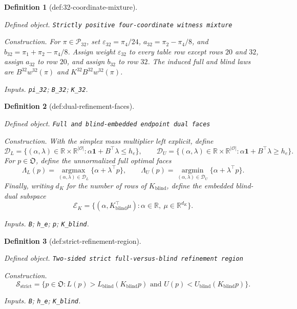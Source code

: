 \documentclass{article}
\newtheorem{definition}{Definition}
\begin{document}
\begin{definition}[def:32-coordinate-mixture]\label{def:32-coordinate-mixture}
\par\smallskip\noindent\emph{Defined object.} \texttt{Strictly positive four-\allowbreak{}coordinate witness mixture}
\par\smallskip\noindent\emph{Construction.} For \(\pi\in\mathcal P_{32}\), set \(\varepsilon_{32}=\pi_4/24\), \(a_{32}=\pi_2-\pi_4/8\), and \(b_{32}=\pi_1+\pi_2-\pi_4/8\). Assign weight \(\varepsilon_{32}\) to every table row except rows \(20\) and \(32\), assign \(a_{32}\) to row \(20\), and assign \(b_{32}\) to row \(32\). The induced full and blind laws are \(B^{32}w^{32}(\pi)\) and \(K^{32}B^{32}w^{32}(\pi)\).
\par\smallskip\noindent\emph{Inputs.} \texttt{pi\_\allowbreak{}32}; \texttt{B\_\allowbreak{}32}; \texttt{K\_\allowbreak{}32}.
\end{definition}

\begin{definition}[def:dual-refinement-faces]\label{def:dual-refinement-faces}
\par\smallskip\noindent\emph{Defined object.} \texttt{Full and blind-\allowbreak{}embedded endpoint dual faces}
\par\smallskip\noindent\emph{Construction.} With the simplex mass multiplier left explicit, define
\[
\mathcal D_L=\{(\alpha,\lambda)\in\mathbb R\times\mathbb R^{|\mathcal O|}:\alpha\mathbf 1+B^{\top}\lambda\leq h_e\},
\qquad
\mathcal D_U=\{(\alpha,\lambda)\in\mathbb R\times\mathbb R^{|\mathcal O|}:\alpha\mathbf 1+B^{\top}\lambda\geq h_e\}.
\]
For \(p\in\mathfrak O\), define the unnormalized full optimal faces
\[
\Lambda_L(p)=\operatorname*{argmax}_{(\alpha,\lambda)\in\mathcal D_L}
\{\alpha+\lambda^{\top}p\},
\qquad
\Lambda_U(p)=\operatorname*{argmin}_{(\alpha,\lambda)\in\mathcal D_U}
\{\alpha+\lambda^{\top}p\}.
\]
Finally, writing \(d_K\) for the number of rows of \(K_{\mathrm{blind}}\), define the embedded blind-dual subspace
\[
\mathcal E_K=\{(\alpha,K_{\mathrm{blind}}^{\top}\mu):
\alpha\in\mathbb R,\ \mu\in\mathbb R^{d_K}\}.
\]
\par\smallskip\noindent\emph{Inputs.} \texttt{B}; \texttt{h\_\allowbreak{}e}; \texttt{p}; \texttt{K\_\allowbreak{}blind}.
\end{definition}

\begin{definition}[def:strict-refinement-region]\label{def:strict-refinement-region}
\par\smallskip\noindent\emph{Defined object.} \texttt{Two-\allowbreak{}sided strict full-\allowbreak{}versus-\allowbreak{}blind refinement region}
\par\smallskip\noindent\emph{Construction.} \[
\mathcal S_{\mathrm{strict}}=
\{p\in\mathfrak O:L(p)>L_{\mathrm{blind}}(K_{\mathrm{blind}}p)
\text{ and }U(p)<U_{\mathrm{blind}}(K_{\mathrm{blind}}p)\}.
\]
\par\smallskip\noindent\emph{Inputs.} \texttt{B}; \texttt{h\_\allowbreak{}e}; \texttt{K\_\allowbreak{}blind}.
\end{definition}
\end{document}
